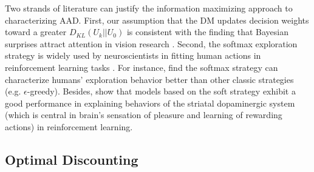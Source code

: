 \documentclass[
  12pt,
]{article}
\begin{document}
Two strands of literature can justify the information maximizing
approach to characterizing AAD. First, our assumption that the DM
updates decision weights toward a greater \(D_{KL}(U_k||U_0)\) is
consistent with the finding that Bayesian surprises attract attention in
vision research \citep{itti2009bayesian}. Second, the softmax
exploration strategy is widely used by neuroscientists in fitting human
actions in reinforcement learning tasks
\citep{daw2006cortical, niv2012neural, fitzgerald2012action, niv2015reinforcement, leong2017dynamic}.
For instance, \citet{daw2006cortical} find the softmax strategy can
characterize humans' exploration behavior better than other classic
strategies (e.g. \(\epsilon\)-greedy). Besides,
\citet{collins2014opponent} show that models based on the soft strategy
exhibit a good performance in explaining behaviors of the striatal
dopaminergic system (which is central in brain's sensation of pleasure
and learning of rewarding actions) in reinforcement learning.

\hypertarget{optimal-discounting}{%
\subsection{\texorpdfstring{Optimal Discounting
\label{optimal_discount}}{Optimal Discounting }}\label{optimal-discounting}}
\end{document}
